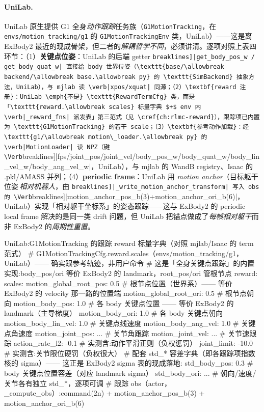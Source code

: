 \paragraph{UniLab.}
UniLab 原生提供 G1 全身\emph{动作跟踪}任务族（\texttt{G1MotionTracking}，在 \texttt{envs/\allowbreak motion\_tracking/\allowbreak g1} 的 \texttt{G1MotionTrackingEnv} 类，UniLab）——这是离 ExBody2 最近的现成骨架，但二者的\emph{解耦哲学不同}，必须讲清。逐项对照上表四环节：（1）\textbf{关键点位姿}：UniLab 的后端 getter \Verb[breaklines]|get_body_pos_w / get_body_quat_w| 直接给 body 世界位姿（\texttt{base/\allowbreak backend/\allowbreak base.\allowbreak py} 的 \texttt{SimBackend} 抽象方法，UniLab），与 mjlab 读 \verb|xpos/xquat| 同源；（2）\textbf{reward 注册}：UniLab \emph{不是} \texttt{RewardTermCfg} 类，而是「\texttt{reward.\allowbreak scales} 标量字典 $+$ env 内 \verb|_reward_fns| 派发表」第三范式（见 \cref{ch:rlmc-reward}），跟踪项已内置为 \texttt{G1MotionTracking} 的若干 scale；（3）\textbf{参考动作加载}：经 \texttt{g1/\allowbreak motion\_loader.\allowbreak py} 的 \verb|MotionLoader| 读 NPZ（键 \Verb[breaklines]|fps/joint_pos/joint_vel/body_pos_w/body_quat_w/body_lin_vel_w/body_ang_vel_w|，UniLab），与 mjlab 的 WandB registry、Isaac 的 .pkl/AMASS 并列；（4）\textbf{periodic frame}：UniLab 用 \emph{motion anchor}（目标躯干位姿\,\emph{相对机器人}，由 \Verb[breaklines]|_write_motion_anchor_transform| 写入 obs 的 \Verb[breaklines]|motion_anchor_pos_b(3)+motion_anchor_ori_b(6)|，UniLab）实现「相对躯干坐标系」的姿态跟踪——这与 ExBody2 的 periodic local frame 解决的是同一类 drift 问题，但 UniLab 把锚点做成了\emph{每帧相对躯干}而非 ExBody2 的\emph{周期性重置}。

\begin{codebox}[Python]{UniLab:G1MotionTracking 的跟踪 reward 标量字典（对照 mjlab/Isaac 的 term 范式）}
# G1MotionTrackingCfg.reward.scales（envs/motion_tracking/g1，UniLab）—— 确实跟参考轨迹，非用户命令
# 这是「全身关键点跟踪」的内置实现:body_pos/ori 等价 ExBody2 的 landmark，root_pos/ori 管根节点
reward:
  scales:
    motion_global_root_pos: 0.5      # 根节点位置（世界系）—— 等价 ExBody2 的 velocity 那一路的位置端
    motion_global_root_ori: 0.5      # 根节点朝向
    motion_body_pos: 1.0             # 各 body 关键点位置 —— 等价 ExBody2 的 landmark（主导梯度）
    motion_body_ori: 1.0             # 各 body 关键点朝向
    motion_body_lin_vel: 1.0         # 关键点线速度
    motion_body_ang_vel: 1.0         # 关键点角速度
    motion_joint_pos: ...            # 关节角跟踪
    motion_joint_vel: ...            # 关节速跟踪
    action_rate_l2: -0.1             # 实测含:动作平滑正则（负权惩罚）
    joint_limit: -10.0               # 实测含:关节限位硬罚（负权很大）
  # 配套 std_* 容差字典（即各跟踪项指数核的 sigma）—— 这正是 ExBody2 sigma 表的现成落地:
  std_body_pos: 0.3                  # body 关键点位置容差（对应 landmark sigma）
  std_body_ori: ...                  # 朝向/速度/关节各有独立 std_*，逐项可调
# 跟踪 obs（actor，_compute_obs）:command(2n) + motion_anchor_pos_b(3) + motion_anchor_ori_b(6)
\end{codebox}

